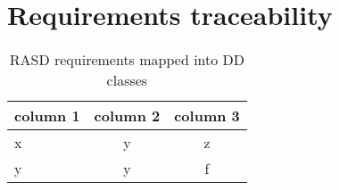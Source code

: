 \pagebreak
\section{Requirements traceability}

\begin{table}[b]
	\caption{RASD requirements mapped into DD classes}
	\label{tab:rasd_requirements}
	\centering

	\begin{tabular}{l|cc}
	\hline

	\hline
	\textbf{column 1} & \textbf{column 2} & \textbf{column 3} \\
	\hline
		x	&	y	&	z	\\
		y	&	y	&	f	\\
	\hline

	\hline
	\end{tabular}
\end{table}